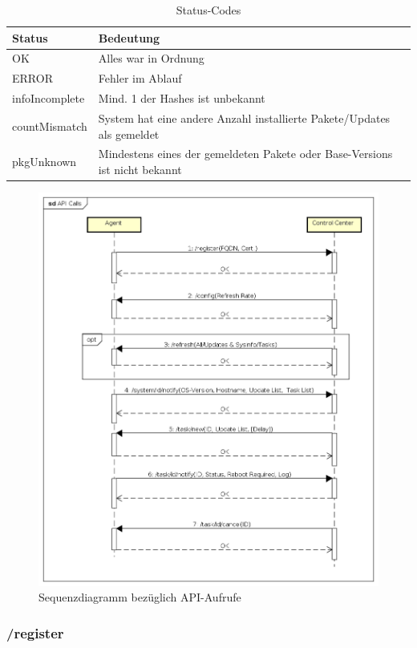 \begin{table}[H]
\centering
\caption{Status-Codes}
\label{api:codes}
\begin{tabular}{ll}
\hline
\textbf{Status} & \textbf{Bedeutung}                                                          \\ \hline
OK              & Alles war in Ordnung                                                        \\
ERROR           & Fehler im Ablauf                                                            \\
infoIncomplete  & Mind. 1 der Hashes ist unbekannt                                            \\
countMismatch   & System hat eine andere Anzahl installierte Pakete/Updates als gemeldet      \\
pkgUnknown      & Mindestens eines der gemeldeten Pakete oder Base-Versions ist nicht bekannt \\ \hline
\end{tabular}
\end{table}


\begin{figure}
  \centering
    \includegraphics[width=\textwidth]{fig/API_Calls}
  \caption{Sequenzdiagramm bezüglich API-Aufrufe}
  \label{fig:api_sequence_diagram}
\end{figure}

\subsubsection{/register}